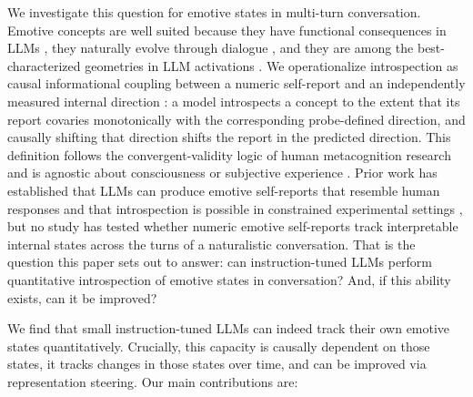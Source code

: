 \documentclass[10pt]{article}
\begin{document}
We investigate this question for emotive states in multi-turn conversation. Emotive concepts are well suited because they have functional consequences in LLMs \citep{CodaForno2023}, they naturally evolve through dialogue \citep{Fazzi2025, Choi2024}, and they are among the best-characterized geometries in LLM activations \citep{ZhangZhong2025, WangEmotion2025}. We operationalize introspection as causal informational coupling between a numeric self-report and an independently measured internal direction \citep{ComShanahan2025}: a model introspects a concept to the extent that its report covaries monotonically with the corresponding probe-defined direction, and causally shifting that direction shifts the report in the predicted direction. This definition follows the convergent-validity logic of human metacognition research \citep{FlemingLau2014, Lapate2020} and is agnostic about consciousness or subjective experience \citep{McClelland2024}. Prior work has established that LLMs can produce emotive self-reports that resemble human responses \citep{Tavast2022} and that introspection is possible in constrained experimental settings \citep{Binder2025, JiAn2025, Lindsey2026, PearsonVogel2026}, but no study has tested whether numeric emotive self-reports track interpretable internal states across the turns of a naturalistic conversation. That is the question this paper sets out to answer: can instruction-tuned LLMs perform quantitative introspection of emotive states in conversation? And, if this ability exists, can it be improved?

We find that small instruction-tuned LLMs can indeed track their own emotive states quantitatively. Crucially, this capacity is causally dependent on those states, it tracks changes in those states over time, and can be improved via representation steering. Our main contributions are:
\end{document}
